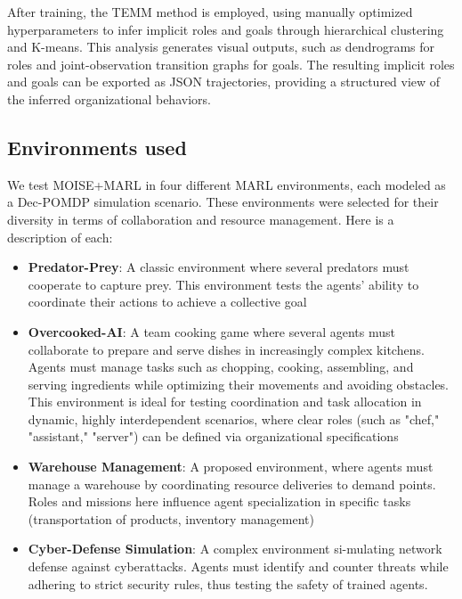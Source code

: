 \documentclass[sigconf]{aamas}
\begin{document}
After training, the TEMM method is employed, using manually optimized hyperparameters to infer implicit roles and goals through hierarchical clustering and K-means. This analysis generates visual outputs, such as dendrograms for roles and joint-observation transition graphs for goals. The resulting implicit roles and goals can be exported as JSON trajectories, providing a structured view of the inferred organizational behaviors.


\subsection{Environments used}

We test MOISE+MARL in four different MARL environments, each modeled as a Dec-POMDP simulation scenario. These environments were selected for their diversity in terms of collaboration and resource management. Here is a description of each:

\begin{itemize}

  \item \textbf{Predator-Prey}: A classic environment where several predators must cooperate to capture prey. This environment tests the agents' ability to coordinate their actions to achieve a collective goal\cite{lowe2017multi}

  \item \textbf{Overcooked-AI}: A team cooking game where several agents must collaborate to prepare and serve dishes in increasingly complex kitchens\cite{overcookedai}. Agents must manage tasks such as chopping, cooking, assembling, and serving ingredients while optimizing their movements and avoiding obstacles. This environment is ideal for testing coordination and task allocation in dynamic, highly interdependent scenarios, where clear roles (such as "chef," "assistant," "server") can be defined via organizational specifications

  \item \textbf{Warehouse Management}: A proposed environment, where agents must manage a warehouse by coordinating resource deliveries to demand points. Roles and missions here influence agent specialization in specific tasks (transportation of products, inventory management)

  \item \textbf{Cyber-Defense Simulation}: A complex environment si-mulating network defense against cyberattacks. Agents must identify and counter threats while adhering to strict security rules, thus testing the safety of trained agents\cite{Maxwell2021}.
\end{itemize}
\end{document}
